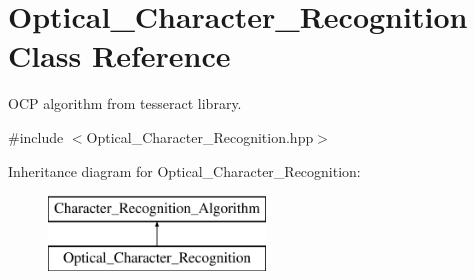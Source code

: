 \hypertarget{class_optical___character___recognition}{}\section{Optical\+\_\+\+Character\+\_\+\+Recognition Class Reference}
\label{class_optical___character___recognition}


O\+CP algorithm from tesseract library.  




{\ttfamily \#include $<$Optical\+\_\+\+Character\+\_\+\+Recognition.\+hpp$>$}

Inheritance diagram for Optical\+\_\+\+Character\+\_\+\+Recognition\+:\begin{figure}[H]
\begin{center}
\leavevmode
\includegraphics[height=2.000000cm]{class_optical___character___recognition}
\end{center}
\end{figure}
